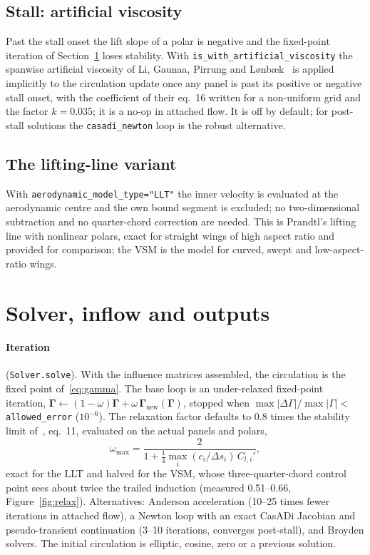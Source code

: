 \documentclass[11pt,a4paper]{article}
\newcommand{\code}[1]{\texttt{#1}}
\begin{document}
\subsection{Stall: artificial viscosity}
\label{sec:stall}
Past the stall onset the lift slope of a polar is negative and the fixed-point iteration of Section~\ref{sec:solver} loses stability. With \code{is\_with\_artificial\_viscosity} the spanwise artificial viscosity of Li, Gaunaa, Pirrung and Lønbæk~\cite{li2026} is applied implicitly to the circulation update once any panel is past its positive or negative stall onset, with the coefficient of their eq.~16 written for a non-uniform grid and the factor $k=0.035$; it is a no-op in attached flow. It is off by default; for post-stall solutions the \code{casadi\_newton} loop is the robust alternative.

\subsection{The lifting-line variant}
\label{sec:llt}
With \code{aerodynamic\_model\_type="LLT"} the inner velocity is evaluated at the aerodynamic centre and the own bound segment is excluded; no two-dimensional subtraction and no quarter-chord correction are needed. This is Prandtl's lifting line with nonlinear polars, exact for straight wings of high aspect ratio and provided for comparison; the VSM is the model for curved, swept and low-aspect-ratio wings.

\section{Solver, inflow and outputs}
\label{sec:solver}
\paragraph{Iteration} (\code{Solver.solve}). With the influence matrices assembled, the circulation is the fixed point of~\eqref{eq:gamma}. The base loop is an under-relaxed fixed-point iteration, $\boldsymbol\Gamma\leftarrow(1-\omega)\boldsymbol\Gamma+\omega\,\boldsymbol\Gamma_{\mathrm{new}}(\boldsymbol\Gamma)$, stopped when $\max|\Delta\Gamma|/\max|\Gamma|<$ \code{allowed\_error} ($10^{-6}$). The relaxation factor defaults to $0.8$ times the stability limit of~\cite{li2026}, eq.~11, evaluated on the actual panels and polars,
\begin{equation}
\omega_{\max}=\frac{2}{1+\tfrac14\max_i (c_i/\Delta s_i)\,C_{l,i}'},
\end{equation}
exact for the LLT and halved for the VSM, whose three-quarter-chord control point sees about twice the trailed induction (measured 0.51--0.66, Figure~\ref{fig:relax}). Alternatives: Anderson acceleration (10--25 times fewer iterations in attached flow), a Newton loop with an exact CasADi Jacobian and pseudo-transient continuation (3--10 iterations, converges post-stall), and Broyden solvers. The initial circulation is elliptic, cosine, zero or a previous solution.
\end{document}
